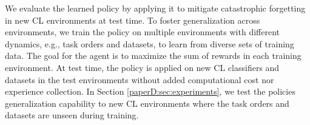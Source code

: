 We evaluate the learned policy by applying it to mitigate catastrophic forgetting in new CL environments at test time. To foster generalization across environments, we train the policy on multiple environments with different dynamics, e.g., task orders and datasets, to learn from diverse sets of training data. The goal for the agent is to maximize the sum of rewards in each training environment. %
At test time, the policy is applied on new CL classifiers and datasets in the test environments without added computational cost nor experience collection. In Section \ref{paperD:sec:experiments}, we test the policies generalization capability to new CL environments where the task orders and datasets are unseen during training.

